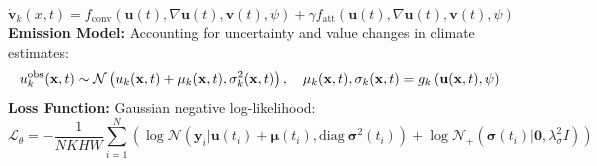 \documentclass[landscape,a1paper,fontscale=0.424]{baposter}
\begin{document}
\begin{poster}
{\begin{equation*}
            \dot{\mathbf{v}}_k(x,t) = f_{\text{conv}} \left( \mathbf{u}(t), \nabla \mathbf{u}(t), \mathbf{v}(t), \psi \right) + \gamma f_{\text{att}} \left( \mathbf{u}(t), \nabla \mathbf{u}(t), \mathbf{v}(t), \psi \right) %
        \end{equation*}
        \textbf{\color{blue}Emission Model:} Accounting for uncertainty and value changes in climate estimates:
        \vspace{-0.5em}
        \begin{equation*}
            u_{k}^{\mathrm{obs}}({\bf x},t)\sim{\cal N}\left(u_{k}({\bf x},t)+\mu_{k}({\bf x},t),\sigma_{k}^{2}({\bf x},t)\right), \quad \mu_{k}({\bf x},t),\sigma_{k}({\bf x},t)=g_{k}\left({\bf u}({\bf x},t),\psi\right)
        \end{equation*}
        \vspace{-0.5em}
        \textbf{\color{blue}Loss Function:} Gaussian negative log-likelihood: %
        \vspace{-0.5em}
        \begin{equation*}
            \mathcal{L}_{\theta} = - \frac{1}{NKHW} \sum_{i=1}^{N} \left( \log \mathcal{N}\left(\mathbf{y}_{i}|\mathbf{u}(t_{i}) + \boldsymbol{\mu}(t_{i}), \text{diag}\ \boldsymbol{\sigma}^{2}(t_{i})\right) + \log \mathcal{N}_{+}\left(\boldsymbol{\sigma}(t_{i})|\boldsymbol{0},\lambda_{\sigma}^{2}I\right) \right)
        \end{equation*}
    }
\end{poster}
\end{document}

